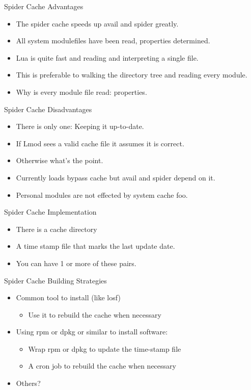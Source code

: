 \documentclass{beamer}
\begin{document}
\begin{frame}{Spider Cache Advantages}
  \begin{itemize}
    \item The spider cache speeds up avail and spider greatly.
    \item All system modulefiles have been read, properties determined.
    \item Lua is quite fast and reading and interpreting a single file.
    \item This is preferable to walking the directory tree and reading
      every module.
    \item Why is every module file read: properties.
  \end{itemize}
\end{frame}

\begin{frame}{Spider Cache Disadvantages}
  \begin{itemize}
    \item There is only one: Keeping it up-to-date.
    \item If Lmod sees a valid cache file it assumes it is correct.
    \item Otherwise what's the point.
    \item Currently loads bypass cache but avail and spider depend on it.
    \item Personal modules are not effected by system cache foo.
  \end{itemize}
\end{frame}

\begin{frame}{Spider Cache Implementation}
  \begin{itemize}
    \item There is a cache directory
    \item A time stamp file that marks the last update date.
    \item You can have 1 or more of these pairs.
  \end{itemize}
\end{frame}

\begin{frame}{Spider Cache Building Strategies}
  \begin{itemize}
    \item Common tool to install (like losf)
      \begin{itemize}
        \item Use it to rebuild the cache when necessary
      \end{itemize}
    \item Using rpm or dpkg or similar to install software:
      \begin{itemize}
        \item Wrap rpm or dpkg to update the time-stamp file
        \item A cron job to rebuild the cache when necessary
      \end{itemize}
    \item Others?
  \end{itemize}
\end{frame}
\end{document}
